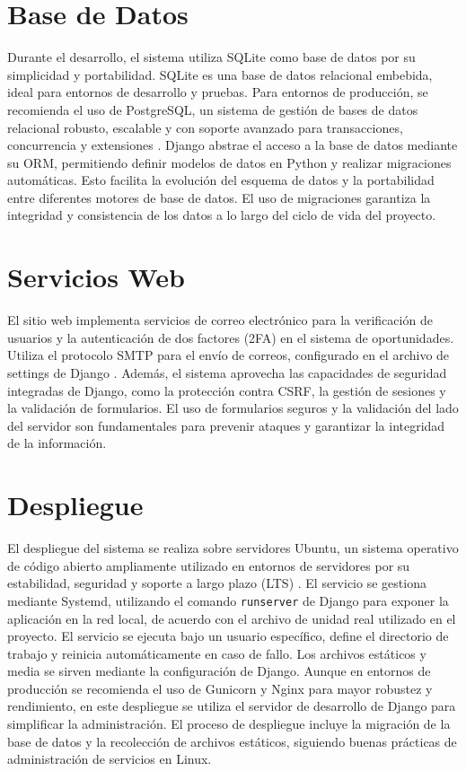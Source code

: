 \section{Base de Datos}
Durante el desarrollo, el sistema utiliza SQLite como base de datos por su simplicidad y portabilidad. SQLite es una base de datos relacional embebida, ideal para entornos de desarrollo y pruebas. Para entornos de producción, se recomienda el uso de PostgreSQL, un sistema de gestión de bases de datos relacional robusto, escalable y con soporte avanzado para transacciones, concurrencia y extensiones \cite{postgresql-docs}. Django abstrae el acceso a la base de datos mediante su ORM, permitiendo definir modelos de datos en Python y realizar migraciones automáticas. Esto facilita la evolución del esquema de datos y la portabilidad entre diferentes motores de base de datos. El uso de migraciones garantiza la integridad y consistencia de los datos a lo largo del ciclo de vida del proyecto.

\section{Servicios Web}
El sitio web implementa servicios de correo electrónico para la verificación de usuarios y la autenticación de dos factores (2FA) en el sistema de oportunidades. Utiliza el protocolo SMTP para el envío de correos, configurado en el archivo de settings de Django \cite{django-email}. Además, el sistema aprovecha las capacidades de seguridad integradas de Django, como la protección contra CSRF, la gestión de sesiones y la validación de formularios. El uso de formularios seguros y la validación del lado del servidor son fundamentales para prevenir ataques y garantizar la integridad de la información.

\section{Despliegue}
El despliegue del sistema se realiza sobre servidores Ubuntu, un sistema operativo de código abierto ampliamente utilizado en entornos de servidores por su estabilidad, seguridad y soporte a largo plazo (LTS) \cite{ubuntu-docs}. El servicio se gestiona mediante Systemd, utilizando el comando \texttt{runserver} de Django para exponer la aplicación en la red local, de acuerdo con el archivo de unidad real utilizado en el proyecto. El servicio se ejecuta bajo un usuario específico, define el directorio de trabajo y reinicia automáticamente en caso de fallo. Los archivos estáticos y media se sirven mediante la configuración de Django. Aunque en entornos de producción se recomienda el uso de Gunicorn y Nginx para mayor robustez y rendimiento, en este despliegue se utiliza el servidor de desarrollo de Django para simplificar la administración. El proceso de despliegue incluye la migración de la base de datos y la recolección de archivos estáticos, siguiendo buenas prácticas de administración de servicios en Linux.
